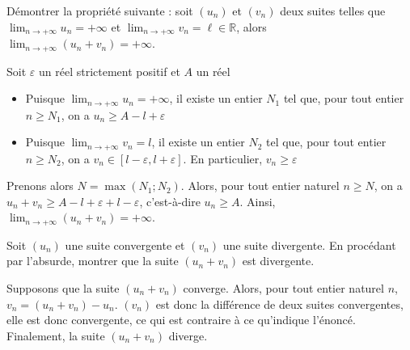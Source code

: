 \documentclass[11pt,fleqn]{book} %
\begin{document}
\begin{exercise}[topic=lim02]Démontrer la propriété suivante : soit $(u_n)$ et $(v_n)$ deux suites telles que $\displaystyle\lim_{n \to + \infty}u_n=+\infty$ et $\displaystyle\lim_{n \to + \infty}v_n=\ell \in \mathbb{R}$, alors $\displaystyle\lim_{n \to + \infty}(u_n+v_n)=+\infty$.\end{exercise}
\begin{solution}Soit $\varepsilon$ un réel strictement positif et $A$ un réel
\begin{itemize}
\item Puisque $\displaystyle\lim_{n \to+\infty}u_n=+\infty$, il existe un entier $N_1$ tel que, pour tout entier $n\geqslant N_1$, on a $u_n \geqslant A - l + \varepsilon$
\item Puisque $\displaystyle\lim_{n \to+\infty}v_n=l$, il existe un entier $N_2$ tel que, pour tout entier $n\geqslant N_2$, on a $v_n \in [l-\varepsilon, l+\varepsilon]$. En particulier, $v_n\geqslant \varepsilon$
\end{itemize}
Prenons alors $N=\max(N_1;N_2)$. Alors, pour tout entier naturel $n \geqslant N$, on a $u_n+v_n \geqslant A -l+\varepsilon +l-\varepsilon$, c'est-à-dire $u_n\geqslant A$. Ainsi, $\displaystyle\lim_{n\to+\infty}(u_n+v_n)=+\infty$.\end{solution}



\begin{exercise}[topic=lim02]Soit $(u_n)$ une suite convergente et $(v_n)$ une suite divergente. En procédant par l'absurde, montrer que la suite $(u_n+v_n)$ est divergente.\end{exercise}

\begin{solution}Supposons que la suite $(u_n+v_n)$ converge. Alors, pour tout entier naturel $n$, $v_n=(u_n+v_n)-u_n$. $(v_n)$ est donc la différence de deux suites convergentes, elle est donc convergente, ce qui est contraire à ce qu'indique l'énoncé. Finalement, la suite $(u_n+v_n)$ diverge.\end{solution}
\end{document}
